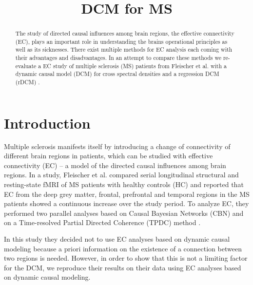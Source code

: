 \documentclass[a4paper,conference]{IEEEtran}
\title{DCM for MS}
\date{}
\begin{document}
\maketitle

\begin{abstract}
The study of directed causal influences among brain regions, the effective connectivity (EC), plays an important role in understanding the brains operational principles \cite{friston_functional_2011} as well as its sicknesses. 
There exist multiple methods for EC analysis each coming with their advantages and disadvantages. 
In an attempt to compare these methods we re-evaluate a EC study of multiple sclerosis (MS) patients from Fleischer et al. \cite{fleischer} with a dynamic causal model (DCM) for cross spectral densities \cite{csd_for_dcm} and a regression DCM (rDCM) \cite{rdcm}.

\end{abstract}

\section{Introduction}

Multiple sclerosis manifests itself by introducing a change of connectivity of different brain regions in patients, which can be studied with effective connectivity (EC) – a model of the directed causal influences among brain regions. In a study, Fleischer et al. \cite{fleischer} compared serial longitudinal structural and resting-state fMRI of MS patients with healthy controls (HC) and reported that EC from the deep grey matter, frontal, prefrontal and temporal regions in the MS patients showed a continuous increase over the study period. To analyze EC, they performed two parallel analyses based on Causal Bayesian Networks (CBN) \cite{smith2011network} and on a Time-resolved Partial Directed Coherence (TPDC) method \cite{vergotte2017dynamics}.

In this study they decided not to use EC analyses based on dynamic causal modeling because a priori information on the existence of a connection between two regions is needed.
However, in order to show that this is not a limiting factor for the DCM, 
we reproduce their results on their data using EC analyses based on dynamic causal modeling.
\end{document}
